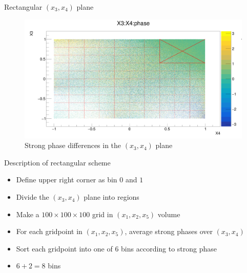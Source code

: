 \documentclass{beamer}
\begin{document}
\begin{frame}{Rectangular $(x_3, x_4)$ plane}
  \begin{figure}
    \centering
    \includegraphics[width = 1.0\textwidth]{X3X4PhaseRegions.png}
    \caption{Strong phase differences in the $(x_3, x_4)$ plane}
  \end{figure}
\end{frame}

\begin{frame}{Description of rectangular scheme}
  \begin{itemize}
    \item{Define upper right corner as bin $0$ and $1$}
    \item{Divide the $(x_3, x_4)$ plane into regions}
    \item{Make a $100\times 100\times 100$ grid in $(x_1, x_2, x_5)$ volume}
    \item{For each gridpoint in $(x_1, x_2, x_5)$, average strong phases over $(x_3, x_4)$}
    \item{Sort each gridpoint into one of $6$ bins according to strong phase}
    \item{$6 + 2 = 8$ bins}
  \end{itemize}
\end{frame}
\end{document}
